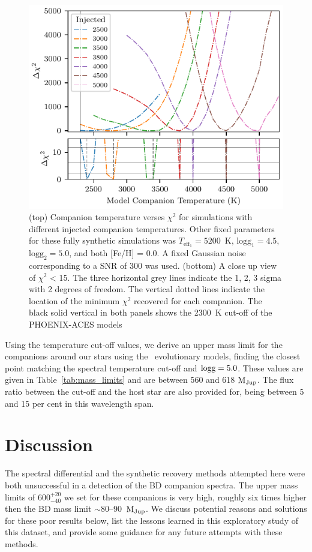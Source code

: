 \documentclass[fleqn,usenatbib]{mnras}
\begin{document}
\begin{figure}
    \centering
    \includegraphics[width=0.95\hsize]{images/fig8.pdf}
    \caption{(top) Companion temperature verses \(\chi^2\) for simulations with different injected companion temperatures. Other fixed parameters for these fully synthetic simulations was \(T_{\textrm{eff}_1}=5200\)~K, \(\textrm{logg}_1=4.5\), \(\textrm{logg}_2=5.0\), and both [Fe/H] = 0.0. A fixed Gaussian noise corresponding to a SNR of 300 was used.
        (bottom) A close up view of \(\chi^2\) < 15. The three horizontal grey lines indicate the 1, 2, 3 sigma with 2 degrees of freedom. The vertical dotted lines indicate the location of the minimum \(\chi^2\) recovered for each companion. The black solid vertical in both panels shows the 2300~K cut-off of the PHOENIX-ACES models}
    \label{fig:injection_shape}
\end{figure}




Using the temperature cut-off values, we derive an upper mass limit for the companions around our stars using the~\citet{baraffe_new_2015} evolutionary models, finding the closest point matching the spectral temperature cut-off and \(\rm logg=5.0\). These values are given in Table~\ref{tab:mass_limits} and are between 560 and 618 \(\rm M_{Jup}\). The flux ratio between the cut-off and the host star are also provided for, being between 5 and 15 per cent in this wavelength span.


\section{Discussion}
\label{sec:discussion}
The spectral differential and the synthetic recovery methods attempted here were both unsuccessful in a detection of the BD companion spectra.  The upper mass limits of \(600^{+20}_{-40}\) we set for these companions is very high, roughly six times higher then the BD mass limit \(\sim\)80--90~\(\rm M_{Jup}\).
We discuss potential reasons and solutions for these poor results below, list the lessons learned in this exploratory study {of this dataset}, and provide some guidance for any future attempts with these methods.
\end{document}
